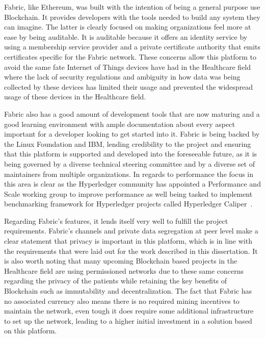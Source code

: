 Fabric, like Ethereum, was built with the intention of being a general purpose
use Blockchain. It provides developers with the tools needed to build any
system they can imagine. The latter is clearly focused on making
organizations feel more at ease by being auditable. It is auditable because it offers an identity
service by using a membership service provider and a private certificate authority that emits certificates specific for the
Fabric network. These concerns allow this platform to avoid the same fate
Internet of Things devices have had in the Healthcare field~\cite{Tana2017} where the lack of security regulations and ambiguity in how data was being collected
by these devices has limited their usage and prevented the widespread usage of
these devices in the Healthcare field.

Fabric also has a good amount of development tools that are now maturing and a
good learning environment with ample documentation about every aspect important
for a developer looking to get started into it. Fabric is being backed by the
Linux Foundation and IBM, lending credibility to the project and ensuring that
this platform is supported and developed into the foreseeable future, as it is
being governed by a diverse technical steering committee and by a diverse set
of maintainers from multiple organizations. In regards to performance the focus
in this area is clear as the Hyperledger community has appointed a Performance
and Scale working group to improve performance as well being tasked to
implement benchmarking framework for Hyperledger projects called Hyperledger
Caliper~\cite{performanceScale2017}.

Regarding Fabric's features, it lends itself very well to fulfill the project
requirements. Fabric's channels and private data segregation at peer level make
a clear statement that privacy is important in this platform, which is in line
with the requirements that were laid out for the work described in this dissertation. It is also worth
noting that many upcoming Blockchain based projects in the Healthcare field are
using permissioned networks due to these same concerns regarding the privacy of
the patients while retaining the key benefits of Blockchain such as
immutability and decentralization. The fact that Fabric has no associated
currency also means there is no required mining incentives to maintain the
network, even tough it does require some additional infrastructure to set up the network, leading to a higher initial investment in a solution
based on this platform.

